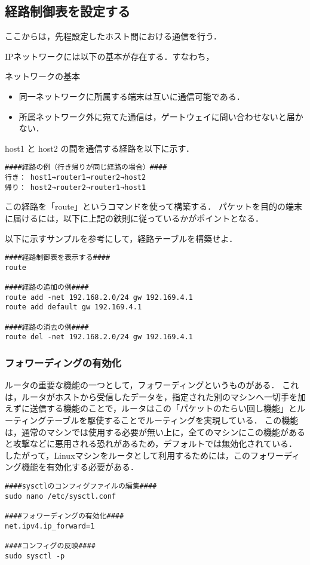 \subsection{経路制御表を設定する}
ここからは，先程設定したホスト間における通信を行う．

IPネットワークには以下の基本が存在する．すなわち，
\medskip
\begin{shadebox}
  ネットワークの基本
\begin{itemize}
	\item 同一ネットワークに所属する端末は互いに通信可能である．
	\item 所属ネットワーク外に宛てた通信は，ゲートウェイに問い合わせないと届かない．
\end{itemize}
\end{shadebox}



\vspace{2mm}
host1 と host2 の間を通信する経路を以下に示す．

\medskip
\begin{shadebox}
\begin{verbatim}
####経路の例（行き帰りが同じ経路の場合）####
行き： host1→router1→router2→host2
帰り： host2→router2→router1→host1
\end{verbatim}
\end{shadebox}

この経路を「route」というコマンドを使って構築する．
パケットを目的の端末に届けるには，以下に上記の鉄則に従っているかがポイントとなる．

以下に示すサンプルを参考にして，経路テーブルを構築せよ．

\medskip
\begin{shadebox}
\begin{verbatim}
####経路制御表を表示する####
route 

####経路の追加の例####
route add -net 192.168.2.0/24 gw 192.169.4.1
route add default gw 192.169.4.1

####経路の消去の例####
route del -net 192.168.2.0/24 gw 192.169.4.1

\end{verbatim}
\end{shadebox}
\vspace{4mm}

\subsubsection{フォワーディングの有効化}
ルータの重要な機能の一つとして，フォワーディングというものがある．
これは，ルータがホストから受信したデータを，指定された別のマシンへ一切手を加えずに送信する機能のことで，ルータはこの「パケットのたらい回し機能」とルーティングテーブルを駆使することでルーティングを実現している．
この機能は，通常のマシンでは使用する必要が無い上に，全てのマシンにこの機能があると攻撃などに悪用される恐れがあるため，デフォルトでは無効化されている．
したがって，Linuxマシンをルータとして利用するためには，このフォワーディング機能を有効化する必要がある．

\begin{shadebox}
\begin{verbatim}
####sysctlのコンフィグファイルの編集####
sudo nano /etc/sysctl.conf

####フォワーディングの有効化####
net.ipv4.ip_forward=1

####コンフィグの反映####
sudo sysctl -p

\end{verbatim}
\end{shadebox}
